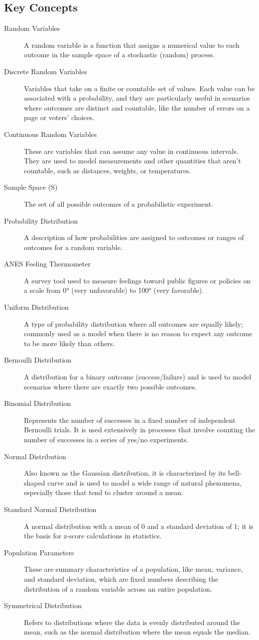 \documentclass{article}
\begin{document}
\subsection*{Key Concepts}
\begin{description}
    \item[Random Variables] A random variable is a function that assigns a numerical value to each outcome in the sample space of a stochastic (random) process.
    \item[Discrete Random Variables] Variables that take on a finite or countable set of values. Each value can be associated with a probability, and they are particularly useful in scenarios where outcomes are distinct and countable, like the number of errors on a page or voters' choices.
    \item[Continuous Random Variables] These are variables that can assume any value in continuous intervals. They are used to model measurements and other quantities that aren't countable, such as distances, weights, or temperatures.
    \item[Sample Space (S)] The set of all possible outcomes of a probabilistic experiment.
    \item[Probability Distribution] A description of how probabilities are assigned to outcomes or ranges of outcomes for a random variable.
    \item[ANES Feeling Thermometer] A survey tool used to measure feelings toward public figures or policies on a scale from 0° (very unfavorable) to 100° (very favorable).
    \item[Uniform Distribution] A type of probability distribution where all outcomes are equally likely; commonly used as a model when there is no reason to expect any outcome to be more likely than others.
    \item[Bernoulli Distribution] A distribution for a binary outcome (success/failure) and is used to model scenarios where there are exactly two possible outcomes.
    \item[Binomial Distribution] Represents the number of successes in a fixed number of independent Bernoulli trials. It is used extensively in processes that involve counting the number of successes in a series of yes/no experiments.
    \item[Normal Distribution] Also known as the Gaussian distribution, it is characterized by its bell-shaped curve and is used to model a wide range of natural phenomena, especially those that tend to cluster around a mean.
    \item[Standard Normal Distribution] A normal distribution with a mean of 0 and a standard deviation of 1; it is the basis for z-score calculations in statistics.
    \item[Population Parameters] These are summary characteristics of a population, like mean, variance, and standard deviation, which are fixed numbers describing the distribution of a random variable across an entire population.
    \item[Symmetrical Distribution] Refers to distributions where the data is evenly distributed around the mean, such as the normal distribution where the mean equals the median.
\end{description}
\end{document}
